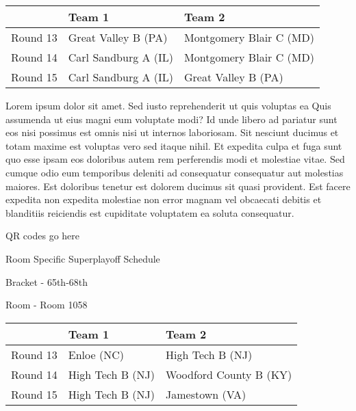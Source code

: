 \documentclass{article}%
\begin{document}
%
\begin{tabularx}{\textwidth}{|c|Y|Y|}%
\hline%
&Team 1&Team 2\\%
\hline%
Round 13&Great Valley B (PA)&Montgomery Blair C (MD)\\%
Round 14&Carl Sandburg A (IL)&Montgomery Blair C (MD)\\%
Round 15&Carl Sandburg A (IL)&Great Valley B (PA)\\%
\hline%
\end{tabularx}%
\vspace*{8pt}%
\newline%
Lorem ipsum dolor sit amet. Sed iusto reprehenderit ut quis voluptas ea Quis assumenda ut eius magni eum voluptate modi? Id unde libero ad pariatur sunt eos nisi possimus est omnis nisi ut internos laboriosam. Sit nesciunt ducimus et totam maxime est voluptas vero sed itaque nihil. Et expedita culpa et fuga sunt quo esse ipsam eos doloribus autem rem perferendis modi et molestiae vitae.\newline%
\newline%
Sed cumque odio eum temporibus deleniti ad consequatur consequatur aut molestias maiores. Est doloribus tenetur est dolorem ducimus sit quasi provident. Est facere expedita non expedita molestiae non error magnam vel obcaecati debitis et blanditiis reiciendis est cupiditate voluptatem ea soluta consequatur.%
\vspace*{140pt}%
\begin{center}%
\begin{Huge}%
QR codes go here%
\end{Huge}%
\end{center}%
\newpage%
\begin{center}%
\begin{Huge}%
Room Specific Superplayoff Schedule%
\end{Huge}%
\vspace*{8pt}%
\linebreak%
\begin{Large}%
Bracket {-} 65th{-}68th%
\end{Large}%
\vspace*{8pt}%
\linebreak%
\vspace*{8pt}%
\begin{Large}%
Room {-} Room 1058%
\end{Large}%
\end{center}%
%
\begin{tabularx}{\textwidth}{|c|Y|Y|}%
\hline%
&Team 1&Team 2\\%
\hline%
Round 13&Enloe (NC)&High Tech B (NJ)\\%
Round 14&High Tech B (NJ)&Woodford County B (KY)\\%
Round 15&High Tech B (NJ)&Jamestown (VA)\\%
\hline%
\end{tabularx}%
\end{document}
